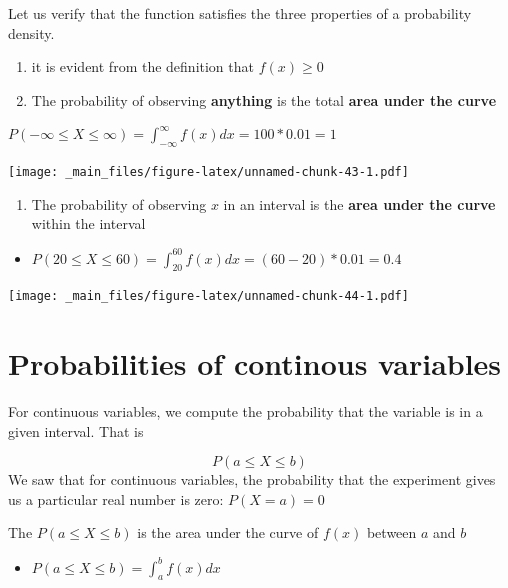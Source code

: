 \documentclass[
]{book}
\providecommand{\tightlist}{%
  \setlength{\itemsep}{0pt}\setlength{\parskip}{0pt}}
\begin{document}
Let us verify that the function satisfies the three properties of a probability density.

\begin{enumerate}
\def\labelenumi{\arabic{enumi})}
\item
  it is evident from the definition that \(f(x) \geq 0\)
\item
  The probability of observing \textbf{anything} is the total \textbf{area under the curve}
\end{enumerate}

\(P(-\infty\leq X \leq \infty)= \int_{-\infty}^{\infty} f(x) dx = 100*0.01= 1\)

\texttt{[image: \_main\_files/figure-latex/unnamed-chunk-43-1.pdf]}

\begin{enumerate}
\def\labelenumi{\arabic{enumi})}
\setcounter{enumi}{2}
\tightlist
\item
  The probability of observing \(x\) in an interval is the \textbf{area under the curve} within the interval
\end{enumerate}

\begin{itemize}
\tightlist
\item
  \(P(20 \leq X \leq 60) = \int_{20}^{60} f(x) dx = (60-20)*0.01=0.4\)
\end{itemize}

\texttt{[image: \_main\_files/figure-latex/unnamed-chunk-44-1.pdf]}

\hypertarget{probabilities-of-continous-variables}{%
\section{Probabilities of continous variables}\label{probabilities-of-continous-variables}}

For continuous variables, we compute the probability that the variable is in a given interval. That is

\[P(a \leq X \leq b)\]
We saw that for continuous variables, the probability that the experiment gives us a particular real number is zero: \(P(X=a)=0\)

The \(P(a \leq X \leq b)\) is the area under the curve of \(f(x)\) between \(a\) and \(b\)

\begin{itemize}
\tightlist
\item
  \(P(a \leq X \leq b) = \int_{a}^{b} f(x) dx\)
\end{itemize}
\end{document}
